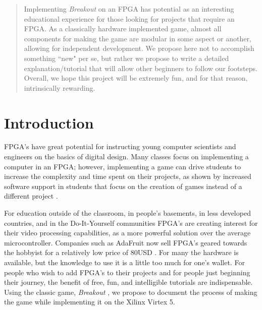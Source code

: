 \documentclass[conference]{IEEEtran}
\begin{document}
\begin{abstract}
Implementing \emph{Breakout} on an FPGA has potential as an interesting educational experience for those looking for projects that require an FPGA. As a classically hardware implemented game, almost all components for making the game are modular in some aspect or another, allowing for independent development. We propose here not to accomplish something ``new" per se, but rather we propose to write a detailed explanation/tutorial that will allow other beginners to follow our footsteps. Overall, we hope this project will be extremely fun, and for that reason, intrinsically rewarding.
\end{abstract}





%
\IEEEpeerreviewmaketitle



\section{Introduction}
FPGA's have great potential for instructing young computer scientists and engineers on the basics of digital design. Many classes focus on implementing a computer in an FPGA; however, implementing a game can drive students to increase the complexity and time spent on their projects, as shown by increased software support in students that focus on the creation of games instead of a different project \cite{Brunvand:2011}.

For education outside of the classroom, in people's basements, in less developed countries, and in the Do-It-Yourself communities FPGA's are creating interest for their video processing capabilities, as a more powerful solution over the average microcontroller. Companies such as AdaFruit now sell FPGA's geared towards the hobbyist for a relatively low price of 80USD \cite{Ada:2013}. For many the hardware is available, but the knowledge to use it is a little too much for one's wallet. For people who wish to add FPGA's to their projects and for people just beginning their journey, the benefit of free, fun, and intelligible tutorials are indispensable. Using the classic game, \emph{Breakout} \cite{Goldberg:2009}, we propose to document the process of making the game while implementing it on the Xilinx Virtex 5.\\
\end{document}
